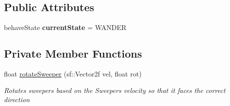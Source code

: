 \subsection*{Public Attributes}
\begin{DoxyCompactItemize}
\item 
\mbox{\label{class_sweeper_a6a5e75e9c3524ee3eb34c707bc6095e4}} 
behave\+State {\bfseries current\+State} = W\+A\+N\+D\+ER
\end{DoxyCompactItemize}
\subsection*{Private Member Functions}
\begin{DoxyCompactItemize}
\item 
float \mbox{\hyperlink{class_sweeper_af1af1e14967e47526c530963b93fcea9}{rotate\+Sweeper}} (sf\+::\+Vector2f vel, float rot)
\begin{DoxyCompactList}\small\item\em Rotates sweepers based on the Sweepers velocity so that it faces the correct direction \end{DoxyCompactList}\end{DoxyCompactItemize}
